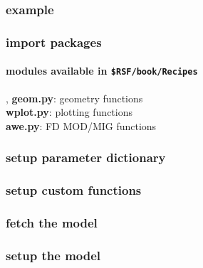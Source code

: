 \begin{frame} \frametitle{example}
  \vfill
\end{frame}
\cwpnote{}

\begin{frame} \frametitle{import packages}
  \framesubtitle{modules available in \texttt{\$RSF/book/Recipes} }
  \sep
  \alert{\textbf{geom.py}}: geometry functions \\
  \alert{\textbf{wplot.py}}: plotting functions \\
  \alert{\textbf{awe.py}}: FD MOD/MIG functions

\end{frame}
\cwpnote{}

\begin{frame} \frametitle{setup parameter dictionary}
\end{frame}
\cwpnote{}


\begin{frame} \frametitle{setup custom functions}
\end{frame}
\cwpnote{}

\begin{frame} \frametitle{fetch the model}
\end{frame}
\cwpnote{}

\begin{frame} \frametitle{setup the model}
\end{frame}
\cwpnote{}

\begin{frame}
\end{frame}

